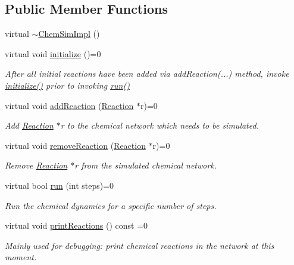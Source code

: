 \subsection*{Public Member Functions}
\begin{DoxyCompactItemize}
\item 
virtual \hyperlink{classchem_1_1ChemSimImpl_a54ce9889cf7a09275d2c8257557a5be1}{$\sim$\-Chem\-Sim\-Impl} ()
\item 
virtual void \hyperlink{classchem_1_1ChemSimImpl_a250b43230ac66832bbcecf4f630f2fbc}{initialize} ()=0
\begin{DoxyCompactList}\small\item\em After all initial reactions have been added via add\-Reaction(...) method, invoke \hyperlink{classchem_1_1ChemSimImpl_a250b43230ac66832bbcecf4f630f2fbc}{initialize()} prior to invoking \hyperlink{classchem_1_1ChemSimImpl_a9f051e00a754fdd76d5e2b3a217f3a49}{run()} \end{DoxyCompactList}\item 
virtual void \hyperlink{classchem_1_1ChemSimImpl_a9000e6ec731865360762f483dd7e91cf}{add\-Reaction} (\hyperlink{classchem_1_1Reaction}{Reaction} $\ast$r)=0
\begin{DoxyCompactList}\small\item\em Add \hyperlink{classchem_1_1Reaction}{Reaction} $\ast$r to the chemical network which needs to be simulated. \end{DoxyCompactList}\item 
virtual void \hyperlink{classchem_1_1ChemSimImpl_a00e43cfb099cb26e44d04a715b6cba0a}{remove\-Reaction} (\hyperlink{classchem_1_1Reaction}{Reaction} $\ast$r)=0
\begin{DoxyCompactList}\small\item\em Remove \hyperlink{classchem_1_1Reaction}{Reaction} $\ast$r from the simulated chemical network. \end{DoxyCompactList}\item 
virtual bool \hyperlink{classchem_1_1ChemSimImpl_a9f051e00a754fdd76d5e2b3a217f3a49}{run} (int steps)=0
\begin{DoxyCompactList}\small\item\em Run the chemical dynamics for a specific number of steps. \end{DoxyCompactList}\item 
virtual void \hyperlink{classchem_1_1ChemSimImpl_a24291dac40633358ab6a9f473d6f861d}{print\-Reactions} () const =0
\begin{DoxyCompactList}\small\item\em Mainly used for debugging\-: print chemical reactions in the network at this moment. \end{DoxyCompactList}\end{DoxyCompactItemize}


